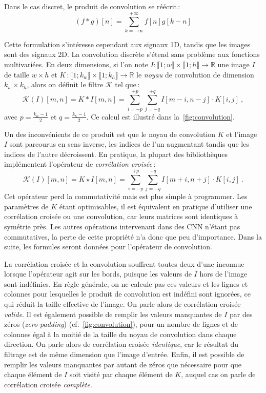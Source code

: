 Dans le cas discret, le produit de convolution se réécrit\,:
\begin{equation}
  (f * g)[n] = \sum_{k=-\infty}^{+\infty} f[n]g[k-n]
\end{equation}

Cette formulation s'intéresse cependant aux signaux 1D, tandis que les images sont des signaux 2D. La convolution discrète s'étend sans problème aux fonctions multivariées. En deux dimensions, si l'on note $I : \llbracket 1;w \rrbracket \times \llbracket 1;h \rrbracket \rightarrow \mathbb{R}$ une image $I$ de taille $w\times{}h$ et $K\,: \llbracket 1;k_w \rrbracket \times \llbracket 1;k_h \rrbracket \rightarrow \mathbb{R}$ le \emph{noyau} de convolution de dimension $k_w \times k_h$, alors on définit le filtre $\mathcal{K}$ tel que\,:
\begin{equation}
  \mathcal{K}(I)[m,n] = K * I [m,n] = \sum_{i=-p}^{+p} \sum_{j=-q}^{+q} I[m - i, n - j] \cdot K[i, j]~,
\end{equation}
avec $p = \frac{k_w-1}{2}$ et $q = \frac{k_h-1}{2}$. Ce calcul est illustré dans la~\cref{fig:convolution}.

Un des inconvénients de ce produit est que le noyau de convolution $K$ et l'image $I$ sont parcourus en sens inverse, les indices de l'un augmentant tandis que les indices de l'autre décroissent. En pratique, la plupart des bibliothèques implémentent l'opérateur de \emph{corrélation croisée}\,:
\begin{equation}
\mathcal{K}(I)[m,n] = K \star I [m, n] = \sum_{i=-p}^{+p} \sum_{j=-q}^{+q} I[m + i, n + j] \cdot K[i, j]~.
\end{equation}
Cet opérateur perd la commutativité mais est plus simple à programmer. Les paramètres de $K$ étant optimisables, il est équivalent en pratique d'utiliser une corrélation croisée ou une convolution, car leurs matrices sont identiques à symétrie près. Les autres opérations intervenant dans des \gls{CNN} n'étant pas commutatives, la perte de cette propriété n'a donc que peu d'importance. Dans la suite, les formules seront données pour l'opérateur de convolution.

La corrélation croisée et la convolution souffrent toutes deux d'une inconnue lorsque l'opérateur agit sur les bords, puisque les valeurs de $I$ hors de l'image sont indéfinies. En règle générale, on ne calcule pas ces valeurs et les lignes et colonnes pour lesquelles le produit de convolution est indéfini sont ignorées, ce qui réduit la taille effective de l'image. On parle alors de corrélation croisée \emph{valide}. Il est également possible de remplir les valeurs manquantes de $I$ par des zéros (\emph{zero-padding}) (cf.~\cref{fig:convolution}), pour un nombre de lignes et de colonnes égal à la moitié de la taille du noyau de convolution dans chaque direction. On parle alors de corrélation croisée \emph{identique}, car le résultat du filtrage est de même dimension que l'image d'entrée. Enfin, il est possible de remplir les valeurs manquantes par autant de zéros que nécessaire pour que chaque élément de $I$ soit visité par chaque élément de $K$, auquel cas on parle de corrélation croisée \emph{complète}.


